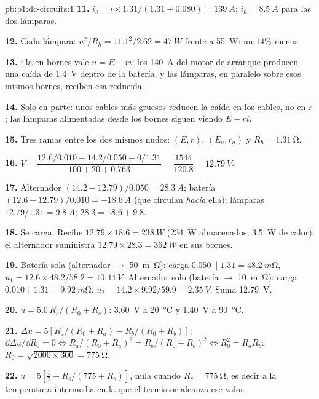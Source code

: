 \begin{solution}{pb:b1:dc-circuits:1}
\textbf{11.} $i_s = i \times 1.31/(1.31 + 0.080) = \qty{139}{A}$; $i_h =
\qty{8.5}{A}$ para las dos lámparas.

\textbf{12.} Cada lámpara: $u^2/R_h = 11.1^2/2.62 = \qty{47}{W}$ frente a
\qty{55}{W}: un $14\%$ menos.

\textbf{13.} : la  en bornes vale $u = E - ri$; los
\qty{140}{A} del motor de arranque producen una caída de \qty{1.4}{V}
dentro de la batería, y las lámparas, en paralelo sobre esos mismos
bornes, reciben esa  reducida.

\textbf{14.} Solo en parte: unos cables más gruesos reducen la caída en los
cables, no en $r$; las lámparas alimentadas desde los bornes siguen viendo $E - ri$.

\textbf{15.} Tres ramas entre los dos mismos nudos: $(E, r)$,
$(E_a, r_a)$ y $R_h = \qty{1.31}{\ohm}$.

\textbf{16.} $V = \dfrac{12.6/0.010 + 14.2/0.050 + 0/1.31}{100 + 20 + 0.763}
= \dfrac{1544}{120.8} = \qty{12.79}{V}$.

\textbf{17.} Alternador $(14.2 - 12.79)/0.050 = \qty{28.3}{A}$; batería
$(12.6 - 12.79)/0.010 = \qty{-18.6}{A}$ (que circulan \emph{hacia} ella);
lámparas $12.79/1.31 = \qty{9.8}{A}$; $28.3 = 18.6 + 9.8$.

\textbf{18.} Se carga. Recibe $12.79 \times 18.6 = \qty{238}{W}$
(\qty{234}{W} almacenados, \qty{3.5}{W} de calor); el alternador suministra
$12.79 \times 28.3 = \qty{362}{W}$ en sus bornes.

\textbf{19.} Batería sola (alternador $\to$ \qty{50}{m\ohm}): carga
$0.050 \parallel 1.31 = \qty{48.2}{m\ohm}$, $u_1 = 12.6 \times 48.2/58.2 =
\qty{10.44}{V}$. Alternador solo (batería $\to$ \qty{10}{m\ohm}): carga
$0.010 \parallel 1.31 = \qty{9.92}{m\ohm}$, $u_2 = 14.2 \times 9.92/59.9 =
\qty{2.35}{V}$. Suma \qty{12.79}{V}.

\textbf{20.} $u = 5.0\,R_s/(R_0 + R_s)$: \qty{3.60}{V} a
\qty{20}{\degreeCelsius} y \qty{1.40}{V} a \qty{90}{\degreeCelsius}.

\textbf{21.} $\Delta u = 5[R_a/(R_0 + R_a) - R_b/(R_0 + R_b)]$;
$\dd\Delta u/\dd R_0 = 0 \Leftrightarrow R_a/(R_0 + R_a)^2 = R_b/(R_0 +
R_b)^2 \Leftrightarrow R_0^2 = R_aR_b$: $R_0 = \sqrt{2000 \times 300} =
\qty{775}{\ohm}$.

\textbf{22.} $u = 5[\tfrac12 - R_s/(775 + R_s)]$, nula cuando $R_s =
\qty{775}{\ohm}$, es decir a la temperatura intermedia en la que el
termistor alcanza ese valor.


\end{solution}
